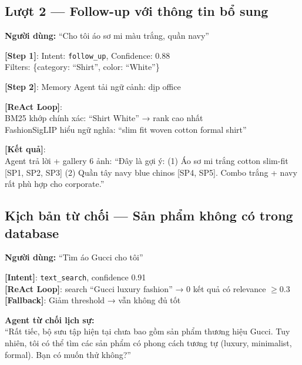 \documentclass[12pt,a4paper]{report}
\begin{document}
\subsection{Lượt 2 --- Follow-up với thông tin bổ sung}

\begin{tcolorbox}[title=Diễn biến Lượt 2]
\textbf{Người dùng:} ``Cho tôi áo sơ mi màu trắng, quần navy''

\textbf{[Step 1]}: Intent: \texttt{follow\_up}, Confidence: 0.88\\
Filters: \{category: ``Shirt'', color: ``White''\}

\textbf{[Step 2]}: Memory Agent tải ngữ cảnh: dịp office

\textbf{[ReAct Loop]}:\\
BM25 khớp chính xác: ``Shirt White'' → rank cao nhất\\
FashionSigLIP hiểu ngữ nghĩa: ``slim fit woven cotton formal shirt''

\textbf{[Kết quả]}:\\
Agent trả lời + gallery 6 ảnh: ``Đây là gợi ý: (1) Áo sơ mi trắng cotton slim-fit [SP1, SP2, SP3] (2) Quần tây navy blue chinos [SP4, SP5]. Combo trắng + navy rất phù hợp cho corporate.''
\end{tcolorbox}

\subsection{Kịch bản từ chối --- Sản phẩm không có trong database}

\begin{tcolorbox}[title=Xử lý khi không tìm thấy kết quả]
\textbf{Người dùng:} ``Tìm áo Gucci cho tôi''

\textbf{[Intent]}: \texttt{text\_search}, confidence 0.91\\
\textbf{[ReAct Loop]}: search ``Gucci luxury fashion'' → 0 kết quả có relevance $\geq 0.3$\\
\textbf{[Fallback]}: Giảm threshold → vẫn không đủ tốt

\textbf{Agent từ chối lịch sự:}\\
``Rất tiếc, bộ sưu tập hiện tại chưa bao gồm sản phẩm thương hiệu Gucci. Tuy nhiên, tôi có thể tìm các sản phẩm có phong cách tương tự (luxury, minimalist, formal). Bạn có muốn thử không?''
\end{tcolorbox}

\end{document}
